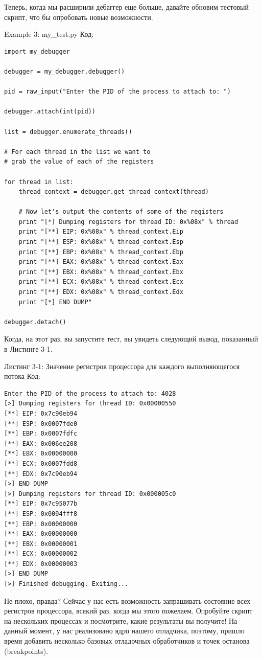 \documentclass[12pt]{book}
\begin{document}
Теперь, когда мы расширили дебаггер еще больше, давайте обновим тестовый скрипт, что бы опробовать новые возможности.

Example 3: my\_test.py
Код:
\begin{lstlisting}
import my_debugger

debugger = my_debugger.debugger()

pid = raw_input("Enter the PID of the process to attach to: ")

debugger.attach(int(pid))

list = debugger.enumerate_threads()

# For each thread in the list we want to
# grab the value of each of the registers

for thread in list:
    thread_context = debugger.get_thread_context(thread)

    # Now let's output the contents of some of the registers
    print "[*] Dumping registers for thread ID: 0x%08x" % thread
    print "[**] EIP: 0x%08x" % thread_context.Eip
    print "[**] ESP: 0x%08x" % thread_context.Esp
    print "[**] EBP: 0x%08x" % thread_context.Ebp
    print "[**] EAX: 0x%08x" % thread_context.Eax
    print "[**] EBX: 0x%08x" % thread_context.Ebx
    print "[**] ECX: 0x%08x" % thread_context.Ecx
    print "[**] EDX: 0x%08x" % thread_context.Edx
    print "[*] END DUMP"

debugger.detach()
\end{lstlisting}

Когда, на этот раз, вы запустите тест, вы увидеть следующий вывод, показанный в Листинге 3-1.

Листинг 3-1: Значение регистров процессора для каждого выполняющегося потока
Код:
\begin{lstlisting}
Enter the PID of the process to attach to: 4028
[>] Dumping registers for thread ID: 0x00000550
[**] EIP: 0x7c90eb94
[**] ESP: 0x0007fde0
[**] EBP: 0x0007fdfc
[**] EAX: 0x006ee208
[**] EBX: 0x00000000
[**] ECX: 0x0007fdd8
[**] EDX: 0x7c90eb94
[>] END DUMP
[>] Dumping registers for thread ID: 0x000005c0
[**] EIP: 0x7c95077b
[**] ESP: 0x0094fff8
[**] EBP: 0x00000000
[**] EAX: 0x00000000
[**] EBX: 0x00000001
[**] ECX: 0x00000002
[**] EDX: 0x00000003
[>] END DUMP
[>] Finished debugging. Exiting...
\end{lstlisting}

Не плохо, правда? Сейчас у нас есть возможность запрашивать состояние всех регистров процессора, всякий раз, когда мы этого пожелаем. Опробуйте скрипт на нескольких процессах и посмотрите, какие результаты вы получите! На данный момент, у нас реализовано ядро нашего отладчика, поэтому, пришло время добавить несколько базовых отладочных обработчиков и точек останова (breakpoints).
\end{document}
